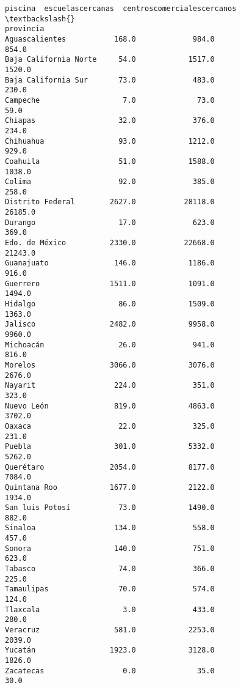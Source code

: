 \documentclass[11pt]{article}
\begin{document}
\begin{tcolorbox}[breakable, boxrule=.5pt, size=fbox, pad at break*=1mm, opacityfill=0]
\begin{Verbatim}[commandchars=\\\{\}]
                       piscina  escuelascercanas  centroscomercialescercanos  \textbackslash{}
provincia
Aguascalientes           168.0             984.0                       854.0
Baja California Norte     54.0            1517.0                      1520.0
Baja California Sur       73.0             483.0                       230.0
Campeche                   7.0              73.0                        59.0
Chiapas                   32.0             376.0                       234.0
Chihuahua                 93.0            1212.0                       929.0
Coahuila                  51.0            1588.0                      1038.0
Colima                    92.0             385.0                       258.0
Distrito Federal        2627.0           28118.0                     26185.0
Durango                   17.0             623.0                       369.0
Edo. de México          2330.0           22668.0                     21243.0
Guanajuato               146.0            1186.0                       916.0
Guerrero                1511.0            1091.0                      1494.0
Hidalgo                   86.0            1509.0                      1363.0
Jalisco                 2482.0            9958.0                      9960.0
Michoacán                 26.0             941.0                       816.0
Morelos                 3066.0            3076.0                      2676.0
Nayarit                  224.0             351.0                       323.0
Nuevo León               819.0            4863.0                      3702.0
Oaxaca                    22.0             325.0                       231.0
Puebla                   301.0            5332.0                      5262.0
Querétaro               2054.0            8177.0                      7084.0
Quintana Roo            1677.0            2122.0                      1934.0
San luis Potosí           73.0            1490.0                       882.0
Sinaloa                  134.0             558.0                       457.0
Sonora                   140.0             751.0                       623.0
Tabasco                   74.0             366.0                       225.0
Tamaulipas                70.0             574.0                       124.0
Tlaxcala                   3.0             433.0                       280.0
Veracruz                 581.0            2253.0                      2039.0
Yucatán                 1923.0            3128.0                      1826.0
Zacatecas                  0.0              35.0                        30.0


\end{Verbatim}
\end{tcolorbox}
\end{document}
